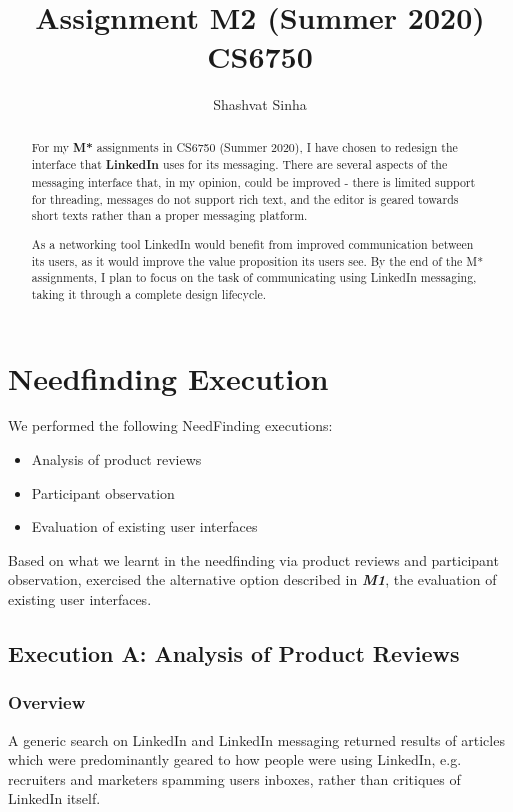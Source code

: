 \documentclass[
	letterpaper, %
]{jdf}
\author{Shashvat Sinha}
\title{Assignment M2 (Summer 2020)\\CS6750}
\begin{document}

\maketitle

\begin{abstract}
    For my \textbf{M*} assignments in CS6750 (Summer 2020), I have chosen to redesign the interface that \textbf{LinkedIn} uses for its messaging. There are several aspects of the messaging interface that, in my opinion, could be improved - there is limited support for threading, messages do not support rich text, and the editor is geared towards short texts rather than a proper messaging platform. 
    
    As a networking tool LinkedIn would benefit from improved communication between its users, as it would improve the value proposition its users see. By the end of the M* assignments, I plan to focus on the task of communicating using LinkedIn messaging, taking it  through a complete design lifecycle. 
\end{abstract}

\section{Needfinding Execution}
We performed the following NeedFinding executions:

\begin{itemize}
    \item Analysis of product reviews
    \item Participant observation
    \item Evaluation of existing user interfaces
\end{itemize}

Based on what we learnt in the needfinding via product reviews and participant observation,  exercised the alternative option described in \textbf{\emph{M1}}, the evaluation of existing user interfaces.


\subsection{Execution A: Analysis of Product Reviews}
\subsubsection{Overview}
A generic search on LinkedIn and LinkedIn messaging returned results of articles which were predominantly geared to how people were using LinkedIn, e.g. recruiters and marketers spamming users inboxes, rather than critiques of LinkedIn itself.
\end{document}
